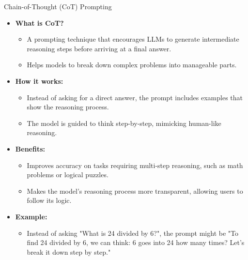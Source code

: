 \begin{frame}[allowframebreaks]{Chain-of-Thought (CoT) Prompting}
    \begin{itemize}
        \item \textbf{What is CoT?}
        \begin{itemize}
            \item A prompting technique that encourages LLMs to generate intermediate reasoning steps before arriving at a final answer.
            \item Helps models to break down complex problems into manageable parts.
        \end{itemize}
        \item \textbf{How it works:}
        \begin{itemize}
            \item Instead of asking for a direct answer, the prompt includes examples that show the reasoning process.
            \item The model is guided to think step-by-step, mimicking human-like reasoning.
        \end{itemize}
    \framebreak
        \item \textbf{Benefits:}
        \begin{itemize}
            \item Improves accuracy on tasks requiring multi-step reasoning, such as math problems or logical puzzles.
            \item Makes the model's reasoning process more transparent, allowing users to follow its logic.
        \end{itemize}
        \item \textbf{Example:}
        \begin{itemize}
            \item Instead of asking "What is 24 divided by 6?", the prompt might be "To find 24 divided by 6, we can think: 6 goes into 24 how many times? Let's break it down step by step."
        \end{itemize}
    \end{itemize}
\end{frame}

